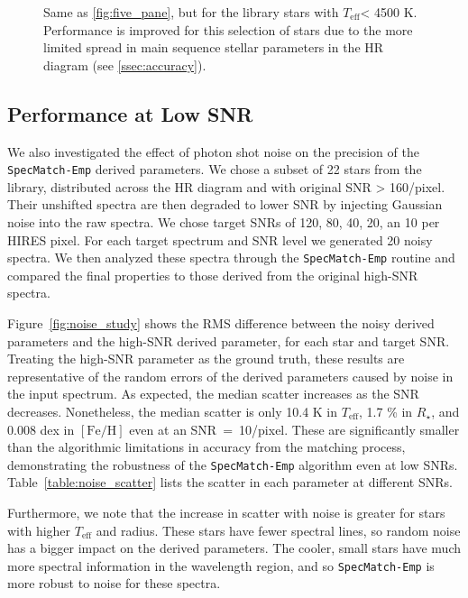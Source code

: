 \documentclass[preprint2]{aastex6}
\newcommand{\SpecMatch}{\texttt{SpecMatch-Emp}\xspace}
\newcommand{\Rstar}{\ensuremath{R_{\star}}\xspace}
\newcommand{\fe}{\ensuremath{\mathrm{[Fe/H]}}\xspace}
\newcommand{\teff}{\ensuremath{T_{\mathrm{eff}}}\xspace}
\begin{document}
\begin{figure*}[t]
\caption{Same as \ref{fig:five_pane}, but for the library stars with \teff < 4500 K. Performance is improved for this selection of stars due to the more limited spread in main sequence stellar parameters in the HR diagram (see \autoref{ssec:accuracy}). \label{fig:five_pane_cool}} 
\end{figure*}

\subsection{Performance at Low SNR}
\label{ssec:precision}

We also investigated the effect of photon shot noise on the precision of the \SpecMatch derived parameters. We chose a subset of 22 stars from the library, distributed across the HR diagram and with original SNR > 160/pixel. Their unshifted spectra are then degraded to lower SNR by injecting Gaussian noise into the raw spectra. We chose target SNRs of 120, 80, 40, 20, an 10 per HIRES pixel. For each target spectrum and SNR level we generated 20 noisy spectra. We then analyzed these spectra through the \SpecMatch routine and compared the final properties to those derived from the original high-SNR spectra.

Figure~\ref{fig:noise_study} shows the RMS difference between the noisy derived parameters and the high-SNR derived parameter, for each star and target SNR. Treating the high-SNR parameter as the ground truth, these results are representative of the random errors of the derived parameters caused by noise in the input spectrum. As expected, the median scatter increases as the SNR decreases. Nonetheless, the median scatter is only 10.4 K in \teff, 1.7 \% in \Rstar, and 0.008 dex in \fe even at an SNR~=~10/pixel. These are significantly smaller than the algorithmic limitations in accuracy from the matching process, demonstrating the robustness of the \SpecMatch algorithm even at low SNRs. Table~\ref{table:noise_scatter} lists the scatter in each parameter at different SNRs.

Furthermore, we note that the increase in scatter with noise is greater for stars with higher \teff and radius. These stars have fewer spectral lines, so random noise has a bigger impact on the derived parameters. The cooler, small stars have much more spectral information in the wavelength region, and so \SpecMatch is more robust to noise for these spectra.
\end{document}
